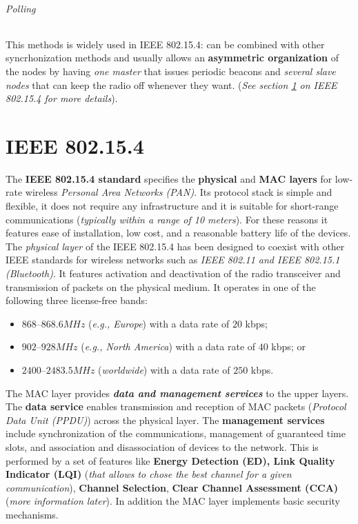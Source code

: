 \documentclass[10pt,a4paper]{report}
\theoremstyle{definition}
\begin{document}
\subparagraph{Polling}\label{sec:polling}
This methods is widely used in IEEE 802.15.4: can be combined with other syncrhonization methods and usually allows an \textbf{asymmetric organization} of the nodes by having  \textit{one master} that issues periodic beacons and \textit{several slave nodes} that can keep the radio off whenever they want. (\textit{See section \ref{sec:ieee-802154-standard} on  IEEE 802.15.4 for more details}).
\chapter{IEEE 802.15.4}
\label{sec:ieee-802154-standard}


The \textbf{IEEE 802.15.4 standard} specifies the \textbf{physical} and \textbf{MAC layers} for low-rate wireless \textit{Personal Area Networks (PAN)}. Its protocol stack is simple and flexible, it does not require any infrastructure and it is suitable for short-range communications (\textit{typically within a range of 10 meters}).
For these reasons it features ease of installation, low cost, and a reasonable battery life of the devices.\\
The \textit{physical layer} of the IEEE 802.15.4 has been designed to coexist with other IEEE standards for wireless networks such as \textit{IEEE 802.11 and IEEE 802.15.1 (Bluetooth)}. It features activation and deactivation of the radio transceiver and transmission of packets on the physical medium. It operates in one of the following three license-free bands:
\begin{itemize}
	\item 
	$868–868.6 MHz$ (\textit{e.g., Europe}) with a data rate of $20$ kbps;
	\item 
	$902–928 MHz$ (\textit{e.g., North America}) with a data rate of $40$ kbps; or
	\item 
	$2400–2483.5 MHz$ (\textit{worldwide}) with a data rate of $250$ kbps.
\end{itemize}

The MAC layer provides \textit{\textbf{data and management services}} to the upper layers. The \textbf{data service} enables transmission and reception of MAC packets (\textit{Protocol Data Unit (PPDU)}) across the physical layer.
The \textbf{management services} include synchronization of the communications, management of guaranteed time slots, and association and disassociation of devices to the network. This is performed by a set of features like \textbf{Energy Detection (ED), Link Quality Indicator (LQI)} (\textit{that allows to chose the best channel for a given communication}), \textbf{Channel Selection}, \textbf{Clear Channel Assessment (CCA)} (\textit{more information later}). In addition the MAC layer implements basic security mechanisms.
\end{document}
